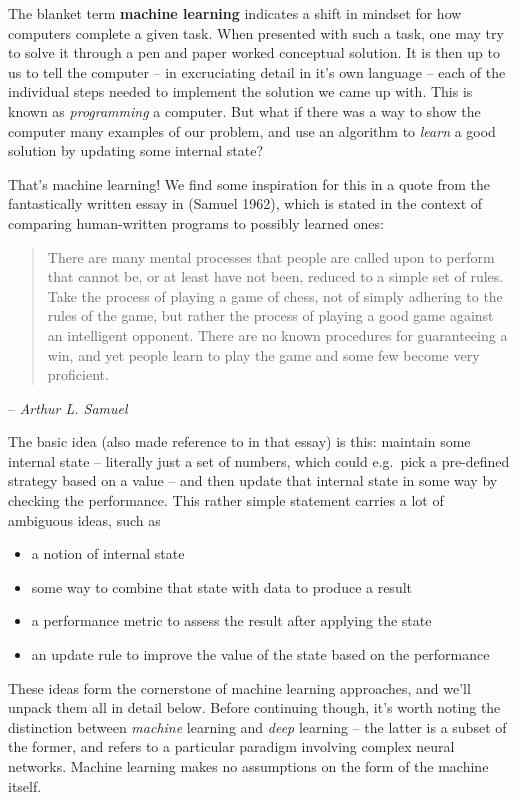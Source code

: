\documentclass[
  11pt,
  numbers=noendperiod]{book}
\providecommand{\tightlist}{%
  \setlength{\itemsep}{0pt}\setlength{\parskip}{0pt}}\usepackage{longtable,booktabs,array}
\begin{document}
The blanket term \textbf{machine learning} indicates a shift in mindset
for how computers complete a given task. When presented with such a
task, one may try to solve it through a pen and paper worked conceptual
solution. It is then up to us to tell the computer -- in excruciating
detail in it's own language -- each of the individual steps needed to
implement the solution we came up with. This is known as
\emph{programming} a computer. But what if there was a way to show the
computer many examples of our problem, and use an algorithm to
\emph{learn} a good solution by updating some internal state?

That's machine learning! We find some inspiration for this in a quote
from the fantastically written essay in (Samuel 1962), which is stated
in the context of comparing human-written programs to possibly learned
ones:

\begin{quote}
There are many mental processes that people are called upon to perform
that cannot be, or at least have not been, reduced to a simple set of
rules. Take the process of playing a game of chess, not of simply
adhering to the rules of the game, but rather the process of playing a
good game against an intelligent opponent. There are no known procedures
for guaranteeing a win, and yet people learn to play the game and some
few become very proficient. 
\end{quote}
\hfill-- \textit{Arthur L. Samuel}

The basic idea (also made reference to in that essay) is this: maintain
some internal state -- literally just a set of numbers, which could
e.g.~pick a pre-defined strategy based on a value -- and then update
that internal state in some way by checking the performance. This rather
simple statement carries a lot of ambiguous ideas, such as

\begin{itemize}
\tightlist
\item
  a notion of internal state
\item
  some way to combine that state with data to produce a result
\item
  a performance metric to assess the result after applying the state
\item
  an update rule to improve the value of the state based on the
  performance
\end{itemize}

These ideas form the cornerstone of machine learning approaches, and
we'll unpack them all in detail below. Before continuing though, it's
worth noting the distinction between \emph{machine} learning and
\emph{deep} learning -- the latter is a subset of the former, and refers
to a particular paradigm involving complex neural networks. Machine
learning makes no assumptions on the form of the machine itself.
\end{document}
